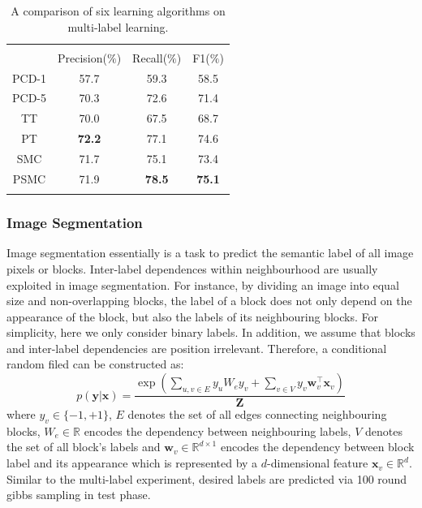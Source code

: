 \begin{table}
	\label{tab:scene_results}
	\center
\begin{tabular}{cccc} 
\Xhline{2\arrayrulewidth} \\ 
       & Precision($\%$) & Recall($\%$) & F1($\%$) \\ \hline 
 PCD-1 & 57.7            & 59.3         & 58.5 \\
 PCD-5 & 70.3            & 72.6         & 71.4 \\
 TT    & 70.0            & 67.5         & 68.7 \\
 PT    & {\bf 72.2}      & 77.1         & 74.6 \\
SMC    & 71.7            & 75.1         & 73.4 \\
PSMC   & 71.9            & {\bf 78.5}   & {\bf 75.1} \\ 
\Xhline{2\arrayrulewidth}
 \end{tabular}
 \caption{A comparison of six learning algorithms on multi-label learning. }
\end{table}

\subsubsection{Image Segmentation} 
Image segmentation essentially is a task to predict the semantic label of all image pixels or blocks.    
Inter-label dependences within neighbourhood are usually exploited in image segmentation. For instance, by dividing an image into equal size and non-overlapping 
blocks, the label of a block does not only depend on the appearance of the block, but also the labels of its neighbouring blocks. For simplicity, here 
we only consider binary labels. In addition, we assume that blocks and inter-label dependencies are position irrelevant. Therefore, a conditional random filed can 
be constructed as:               
\begin{equation}
	p(\mathbf{y}|\mathbf{x})=\frac{\exp(\sum_{u,v\in E}y_u W_e y_v+\sum_{v\in V} y_v \mathbf{w}_v^\top \mathbf{x}_v) }{\mathbf{Z}}
\end{equation}
where $y_v\in\{-1,+1\}$, $E$ denotes the set of all edges connecting neighbouring blocks, $W_e\in\mathbb{R}$ encodes the dependency between neighbouring labels, $V$ denotes the set of all 
block's labels and $\mathbf{w}_v\in \mathbb{R}^{d\times 1}$ encodes the dependency between block label and its appearance which is represented by a $d$-dimensional feature $\mathbf{x}_v\in\mathbb{R}^d$.    
Similar to the multi-label experiment, desired labels are predicted via 100 round gibbs sampling in test phase.      

